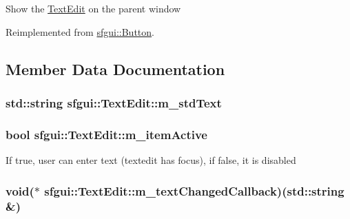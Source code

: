 Show the \hyperlink{classsfgui_1_1TextEdit}{TextEdit} on the parent window 

Reimplemented from \hyperlink{classsfgui_1_1Button_94dc6919349ff5ca9f334cce78afbe39}{sfgui::Button}.

\subsection{Member Data Documentation}
\hypertarget{classsfgui_1_1TextEdit_08de851a32aa8dd650e33dfcb376bfd8}{
\subsubsection[m\_\-stdText]{\setlength{\rightskip}{0pt plus 5cm}std::string {\bf sfgui::TextEdit::m\_\-stdText}}}
\label{classsfgui_1_1TextEdit_08de851a32aa8dd650e33dfcb376bfd8}


\hypertarget{classsfgui_1_1TextEdit_8ffa5546b2fd4901837b13a118f9beef}{
\subsubsection[m\_\-itemActive]{\setlength{\rightskip}{0pt plus 5cm}bool {\bf sfgui::TextEdit::m\_\-itemActive}}}
\label{classsfgui_1_1TextEdit_8ffa5546b2fd4901837b13a118f9beef}


If true, user can enter text (textedit has focus), if false, it is disabled \hypertarget{classsfgui_1_1TextEdit_a6d415ef1daf7f9fdf0dec3d71cb8eab}{
\subsubsection[m\_\-textChangedCallback]{\setlength{\rightskip}{0pt plus 5cm}void($\ast$ {\bf sfgui::TextEdit::m\_\-textChangedCallback})(std::string \&)}}
\label{classsfgui_1_1TextEdit_a6d415ef1daf7f9fdf0dec3d71cb8eab}


